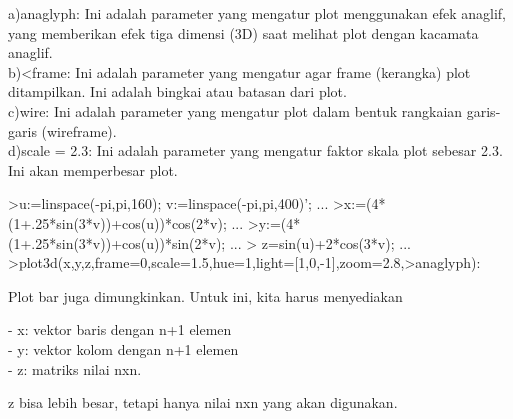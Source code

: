 \documentclass{article}
\begin{document}
\begin{eulernotebook}
\begin{eulercomment}
\begin{eulercomment}
\begin{eulercomment}
\begin{eulercomment}
\begin{eulercomment}
\begin{eulercomment}
\begin{eulercomment}
a)anaglyph: Ini adalah parameter yang mengatur plot menggunakan efek
anaglif, yang memberikan efek tiga dimensi (3D) saat melihat plot
dengan kacamata anaglif.\\
b)\textless{}frame: Ini adalah parameter yang mengatur agar frame (kerangka)
plot ditampilkan. Ini adalah bingkai atau batasan dari plot.\\
c)wire: Ini adalah parameter yang mengatur plot dalam bentuk rangkaian
garis-garis (wireframe).\\
d)scale = 2.3: Ini adalah parameter yang mengatur faktor skala plot
sebesar 2.3. Ini akan memperbesar plot.
\end{eulercomment}
\begin{eulerprompt}
>u:=linspace(-pi,pi,160); v:=linspace(-pi,pi,400)';  ...
>x:=(4*(1+.25*sin(3*v))+cos(u))*cos(2*v); ...
>y:=(4*(1+.25*sin(3*v))+cos(u))*sin(2*v); ...
> z=sin(u)+2*cos(3*v); ...
>plot3d(x,y,z,frame=0,scale=1.5,hue=1,light=[1,0,-1],zoom=2.8,>anaglyph):
\end{eulerprompt}
\begin{eulercomment}
Plot bar juga dimungkinkan. Untuk ini, kita harus menyediakan

- x: vektor baris dengan n+1 elemen\\
- y: vektor kolom dengan n+1 elemen\\
- z: matriks nilai nxn.

z bisa lebih besar, tetapi hanya nilai nxn yang akan digunakan.


\end{eulercomment}
\end{eulercomment}
\end{eulercomment}
\end{eulercomment}
\end{eulercomment}
\end{eulercomment}
\end{eulercomment}
\end{eulernotebook}
\end{document}
